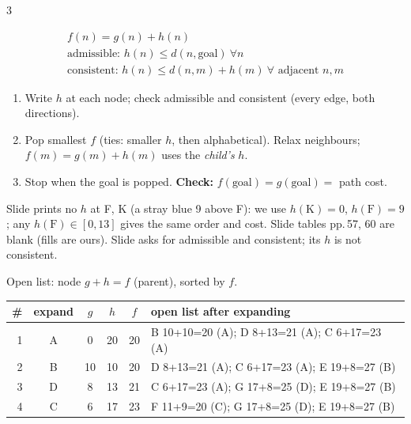 \begin{multicols}{3}
\label{w12:astar}
\begin{fbx}[A* priority \pg{59}]
\begin{gather*}f(n)=g(n)+h(n)\\ \text{admissible: }h(n)\le d(n,\text{goal})\ \forall n\\ \text{consistent: }h(n)\le d(n,m)+h(m)\ \forall\text{ adjacent }n,m\end{gather*}
\end{fbx}
\begin{recipe}[A*]
\begin{enumerate}
\item Write $h$ at each node; check admissible and consistent (every edge, both directions).
\item Pop smallest $f$ (ties: smaller $h$, then alphabetical). Relax neighbours; $f(m)=g(m)+h(m)$ uses the \emph{child's} $h$.
\item Stop when the goal is popped. \textbf{Check:} $f(\text{goal})=g(\text{goal})=$ path cost.
\end{enumerate}
\end{recipe}
\begin{slideerr}[pp.\,56--60]
Slide prints no $h$ at F, K (a stray blue 9 above F): we use $h(\text{K})=0$, $h(\text{F})=9$; any $h(\text{F})\in[0,13]$ gives the same order and cost. Slide tables pp.\,57, 60 are blank (fills are ours). Slide asks for admissible and consistent; its $h$ is not consistent.
\end{slideerr}
\begin{worked}[SAMPLE 4a: A*, A to K]
Open list: node $g{+}h{=}f$ (parent), sorted by $f$.\par\vspace{1pt}
\scriptsize\setlength{\tabcolsep}{1.5pt}
\begin{tabularx}{\linewidth}{@{}rcccc>{\raggedright\arraybackslash}X@{}}\toprule
\# & expand & $g$ & $h$ & $f$ & open list after expanding\\\midrule
1 & A & 0 & 20 & 20 & B 10+10=20 (A); D 8+13=21 (A); C 6+17=23 (A)\\
2 & B & 10 & 10 & 20 & D 8+13=21 (A); C 6+17=23 (A); E 19+8=27 (B)\\
3 & D & 8 & 13 & 21 & C 6+17=23 (A); G 17+8=25 (D); E 19+8=27 (B)\\
4 & C & 6 & 17 & 23 & F 11+9=20 (C); G 17+8=25 (D); E 19+8=27 (B)\\

\end{tabularx}
\end{worked}
\end{multicols}
